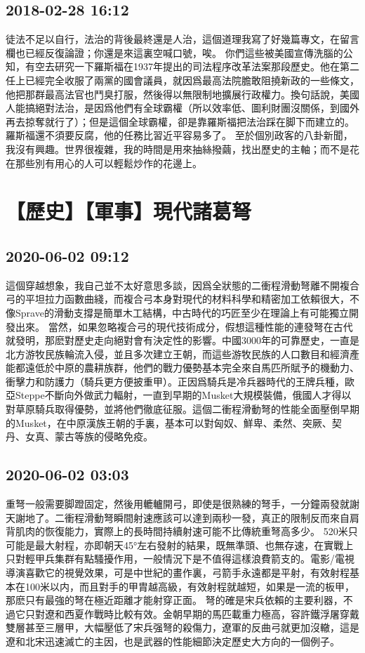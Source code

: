 \documentclass[twocolumn]{ctexart}
\begin{document}
\subsection*{2018-02-28 16:12}

徒法不足以自行，法治的背後最終還是人治，這個道理我寫了好幾篇專文，在留言欄也已經反復論證；你還是來這裏空喊口號，唉。
你們這些被美國宣傳洗腦的公知，有空去研究一下羅斯福在1937年提出的司法程序改革法案那段歷史。他在第二任上已經完全收服了兩黨的國會議員，就因爲最高法院膽敢阻撓新政的一些條文，他把那群最高法官也鬥臭打服，然後得以無限制地擴展行政權力。換句話說，美國人能搞絕對法治，是因爲他們有全球霸權（所以效率低、圖利財團沒關係，到國外再去掠奪就行了）；但是這個全球霸權，卻是靠羅斯福把法治踩在脚下而建立的。羅斯福還不須要反腐，他的任務比習近平容易多了。
至於個別政客的八卦新聞，我沒有興趣。世界很複雜，我的時間是用來抽絲撥繭，找出歷史的主軸；而不是花在那些別有用心的人可以輕鬆炒作的花邊上。
\section*{【歷史】【軍事】現代諸葛弩}
\subsection*{2020-06-02 09:12}

這個穿越想象，我自己並不太好意思多談，因爲全狀態的二衝程滑動弩離不開複合弓的平坦拉力函數曲綫，而複合弓本身對現代的材料科學和精密加工依賴很大，不像Sprave的滑動支撐是簡單木工結構，中古時代的巧匠至少在理論上有可能獨立開發出來。 
當然，如果忽略複合弓的現代技術成分，假想這種性能的連發弩在古代就發明，那麽對歷史走向絕對會有決定性的影響。中國3000年的可靠歷史，一直是北方游牧民族輪流入侵，並且多次建立王朝，而這些游牧民族的人口數目和經濟產能都遠低於中原的農耕族群，他們的戰力優勢基本完全來自馬匹所賦予的機動力、衝擊力和防護力（騎兵更方便披重甲）。正因爲騎兵是冷兵器時代的王牌兵種，歐亞Steppe不斷向外做武力輻射，一直到早期的Musket大規模裝備，俄國人才得以對草原騎兵取得優勢，並將他們徹底征服。這個二衝程滑動弩的性能全面壓倒早期的Musket，在中原漢族王朝的手裏，基本可以對匈奴、鮮卑、柔然、突厥、契丹、女真、蒙古等族的侵略免疫。
\subsection*{2020-06-02 03:03}

重弩一般需要脚蹬固定，然後用轆轤開弓，即使是很熟練的弩手，一分鐘兩發就謝天謝地了。二衝程滑動弩瞬間射速應該可以達到兩秒一發，真正的限制反而來自肩背肌肉的恢復能力，實際上的長時間持續射速可能不比傳統重弩高多少。 
520米只可能是最大射程，亦即朝天45°左右發射的結果，既無準頭、也無存速，在實戰上只對輕甲兵集群有點騷擾作用，一般情況下是不值得這樣浪費箭支的。電影/電視導演喜歡它的視覺效果，可是中世紀的畫作裏，弓箭手永遠都是平射，有效射程基本在100米以内，而且對手的甲胄越高級，有效射程就越短，如果是一流的板甲，那麽只有最強的弩在極近距離才能射穿正面。 
弩的確是宋兵依賴的主要利器，不過它只對遼和西夏作戰時比較有效。金朝早期的馬匹載重力極高，容許鐵浮屠穿戴雙層甚至三層甲，大幅壓低了宋兵强弩的殺傷力，遼軍的反曲弓就更加沒轍，這是遼和北宋迅速滅亡的主因，也是武器的性能細節決定歷史大方向的一個例子。
\end{document}
